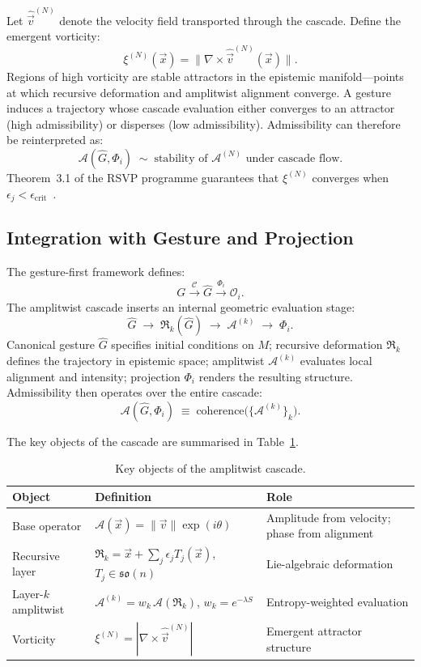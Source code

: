 \documentclass[11pt, a4paper]{article}
\begin{document}
Let $\hat{\vec{v}}^{(N)}$ denote the velocity field transported through
the cascade. Define the emergent vorticity:
\[
  \xi^{(N)}(\vec{x}) = \|\nabla \times \hat{\vec{v}}^{(N)}(\vec{x})\|.
\]
Regions of high vorticity are stable attractors in the epistemic
manifold---points at which recursive deformation and amplitwist alignment
converge. A gesture induces a trajectory whose cascade evaluation either
converges to an attractor (high admissibility) or disperses (low
admissibility). Admissibility can therefore be reinterpreted as:
\[
  \mathcal{A}(\hat{G}, \Phi_i) \;\sim\;
  \text{stability of } \mathcal{A}^{(N)} \text{ under cascade flow}.
\]
Theorem~3.1 of the RSVP programme guarantees that $\xi^{(N)}$ converges
when $\epsilon_j < \epsilon_{\mathrm{crit}}$~\cite{juarrero1999}.

\subsection{Integration with Gesture and Projection}

The gesture-first framework defines:
\[
  G \xrightarrow{\mathcal{C}} \hat{G} \xrightarrow{\Phi_i} \mathcal{O}_i.
\]
The amplitwist cascade inserts an internal geometric evaluation stage:
\[
  \hat{G} \;\longrightarrow\;
  \mathfrak{R}_k(\hat{G}) \;\longrightarrow\;
  \mathcal{A}^{(k)} \;\longrightarrow\;
  \Phi_i.
\]
Canonical gesture $\hat{G}$ specifies initial conditions on $M$;
recursive deformation $\mathfrak{R}_k$ defines the trajectory in
epistemic space; amplitwist $\mathcal{A}^{(k)}$ evaluates local
alignment and intensity; projection $\Phi_i$ renders the resulting
structure. Admissibility then operates over the entire cascade:
\[
  \mathcal{A}(\hat{G}, \Phi_i)
  \;\equiv\;
  \mathrm{coherence}\bigl(\{\mathcal{A}^{(k)}\}_k\bigr).
\]

The key objects of the cascade are summarised in
Table~\ref{tab:cascade}.

\begin{table}[H]
\centering
\renewcommand{\arraystretch}{1.35}
\begin{tabular}{@{}p{3.0cm}p{6.0cm}p{4.8cm}@{}}
\toprule
\textbf{Object} & \textbf{Definition} & \textbf{Role} \\
\midrule
Base operator &
  $\mathcal{A}(\vec{x}) = \|\vec{v}\|\exp(i\theta)$ &
  Amplitude from velocity; phase from alignment \\[4pt]
Recursive layer &
  $\mathfrak{R}_k = \vec{x} + \sum_j\epsilon_j T_j(\vec{x})$, $T_j\in\mathfrak{so}(n)$ &
  Lie-algebraic deformation \\[4pt]
Layer-$k$ amplitwist &
  $\mathcal{A}^{(k)} = w_k\,\mathcal{A}(\mathfrak{R}_k)$, $w_k=e^{-\lambda S}$ &
  Entropy-weighted evaluation \\[4pt]
Vorticity &
  $\xi^{(N)} = |\nabla\times\hat{\vec{v}}^{(N)}|$ &
  Emergent attractor structure \\
\bottomrule
\end{tabular}
\caption{Key objects of the amplitwist cascade.}
\label{tab:cascade}
\end{table}
\end{document}
